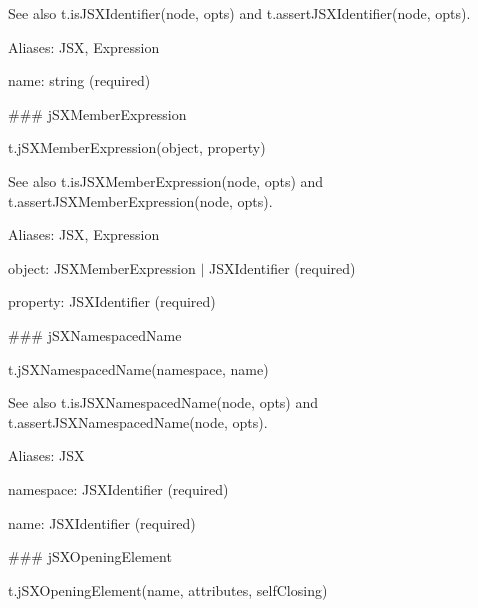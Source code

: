 See also {\ttfamily t.\+is\+J\+S\+X\+Identifier(node, opts)} and {\ttfamily t.\+assert\+J\+S\+X\+Identifier(node, opts)}.

Aliases\+: {\ttfamily J\+SX}, {\ttfamily Expression}


\begin{DoxyItemize}
\item {\ttfamily name}\+: {\ttfamily string} (required) 


\end{DoxyItemize}

\#\#\# j\+S\+X\+Member\+Expression 
\begin{DoxyCode}
t.jSXMemberExpression(object, property)
\end{DoxyCode}


See also {\ttfamily t.\+is\+J\+S\+X\+Member\+Expression(node, opts)} and {\ttfamily t.\+assert\+J\+S\+X\+Member\+Expression(node, opts)}.

Aliases\+: {\ttfamily J\+SX}, {\ttfamily Expression}


\begin{DoxyItemize}
\item {\ttfamily object}\+: {\ttfamily J\+S\+X\+Member\+Expression $\vert$ J\+S\+X\+Identifier} (required)
\item {\ttfamily property}\+: {\ttfamily J\+S\+X\+Identifier} (required) 


\end{DoxyItemize}

\#\#\# j\+S\+X\+Namespaced\+Name 
\begin{DoxyCode}
t.jSXNamespacedName(namespace, name)
\end{DoxyCode}


See also {\ttfamily t.\+is\+J\+S\+X\+Namespaced\+Name(node, opts)} and {\ttfamily t.\+assert\+J\+S\+X\+Namespaced\+Name(node, opts)}.

Aliases\+: {\ttfamily J\+SX}


\begin{DoxyItemize}
\item {\ttfamily namespace}\+: {\ttfamily J\+S\+X\+Identifier} (required)
\item {\ttfamily name}\+: {\ttfamily J\+S\+X\+Identifier} (required) 


\end{DoxyItemize}

\#\#\# j\+S\+X\+Opening\+Element 
\begin{DoxyCode}
t.jSXOpeningElement(name, attributes, selfClosing)
\end{DoxyCode}


